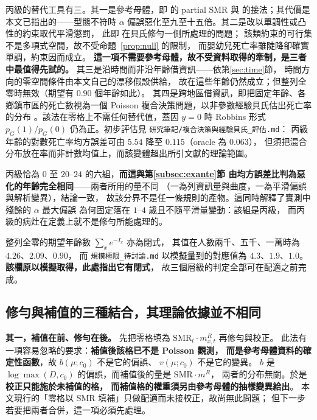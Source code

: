 \documentclass[UTF8, fontset=macnew, a4paper, 12pt]{ctexart}
\begin{document}
丙級的替代工具有三。其一是參考母體，即 \citet{lee2003} 的 partial SMR
與 \citet{yue2019} 的接法；其代價是本文已指出的——型態不符時
$\alpha$ 偏誤惡化至九至十五倍。其二是改以單調性或凸性的約束取代平滑懲罰，
此即 \citet{broffitt1988} 在貝氏修勻一側所處理的問題；
該類約束的可行集不是多項式空間，故不受命題~\ref{prop:null} 的限制，
而嬰幼兒死亡率雖陡降卻確實單調，約束因而成立。
\textbf{這一項不需要參考母體，故不受資料取得的牽制，是三者中最值得先試的。}
其三是沿時間而非沿年齡借資訊——依第\ref{sec:time}節，
時間方向的零空間條件由本文自己的漂移假設供給，
故在這些年齡仍然成立；但整列全零時無效（期望有 $0.90$ 個年齡如此）。
其四是跨地區借資訊，即把固定年齡、各鄉鎮市區的死亡數視為一個
Poisson 複合決策問題，以非參數經驗貝氏估出死亡率的分布
\citep{favaro2024}。該法在零格上不需任何替代值，蓋因 $y=0$ 時
Robbins 形式 $p_G(1)/p_G(0)$ 仍為正。初步評估見
\texttt{研究筆記/複合決策與經驗貝氏\_評估.md}：
丙級年齡的對數死亡率均方誤差可由 $5.54$ 降至 $0.115$（oracle 為 $0.063$），
但須把混合分布放在率而非計數均值上，而該變體超出所引文獻的理論範圍。

丙級恰為 $0$ 至 $20$--$24$ 的六組，\textbf{而這與第\ref{subsec:exante}節
由均方誤差比判為惡化的年齡完全相同}——兩者所用的量不同
（一為列資訊量與曲度，一為平滑偏誤與解析變異），結論一致，
故該分界不是任一條規則的產物。這同時解釋了實測中殘餘的 $\alpha$ 最大偏誤
為何固定落在 $1$--$4$ 歲且不隨平滑量變動：該組是丙級，
而丙級的病灶在定義上就不是修勻所能處理的。

整列全零的期望年齡數 $\sum_x e^{-I_x}$ 亦為閉式，
其值在人數兩千、五千、一萬時為 $4.26$、$2.09$、$0.90$，
而 \texttt{規模極限\_待討論.md} 以模擬量到的對應值為
$4.3$、$1.9$、$1.0$。\textbf{該欄原以模擬取得，此處指出它有閉式}，
故三個層級的判定全部可在配適之前完成。

\subsection{修勻與補值的三種結合，其理論依據並不相同}\label{subsec:combine}

\textbf{其一，補值在前、修勻在後。} 先把零格填為
$\mathrm{SMR}_t\cdot m^{R}_{x,t}$ 再修勻與校正。
此法有一項容易忽略的要求：\textbf{補值後該格已不是 Poisson 觀測，
而是參考母體資料的確定性函數}，故 $b(\mu;c_0)$ 不是它的偏誤、
$v(\mu;c_0)$ 不是它的變異。
$b$ 是 $\log\max(D,c_0)$ 的偏誤，而補值後的量是 $\mathrm{SMR}\cdot m^R$，
兩者的分布無關。於是\textbf{校正只能施於未補值的格，
而補值格的權重須另由參考母體的抽樣變異給出}。
本文現行的「零格以 SMR 填補」只做配適而未接校正，故尚無此問題；
但下一步若要把兩者合併，這一項必須先處理。
\end{document}
